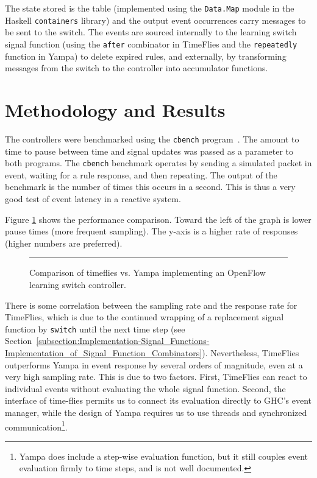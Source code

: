 The state stored is the table (implemented using the {\tt Data.Map} module in the
Haskell {\tt containers} library) and the output event occurrences carry messages
to be sent to the switch. The events are sourced internally to the learning
switch signal function (using the {\tt after} combinator in TimeFlies and the {\tt repeatedly}
function in Yampa) to delete expired rules, and externally, by transforming messages
from the switch to the controller into accumulator functions.

\section{Methodology and Results}
\label{section:Evaluation_and_Comparisons-Methodology_and_Results}

The controllers were benchmarked using the {\tt cbench} program~\cite{cbench}. The
amount to time to pause between time and signal updates was passed as a parameter to
both programs. The {\tt cbench} benchmark operates by sending a simulated packet in
event, waiting for a rule response, and then repeating. The output of the benchmark
is the number of times this occurs in a second. This is thus a very good test of
event latency in a reactive system.

Figure \ref{fig:timeflies-yampa-comparison} shows the performance comparison.
Toward the left of the graph is lower pause times (more frequent sampling). The
y-axis is a higher rate of responses (higher numbers are preferred). 

\begin{figure}
\hrule
\caption{Comparison of timeflies vs. Yampa implementing an OpenFlow learning switch controller.}
\label{fig:timeflies-yampa-comparison}
\end{figure}

There is some correlation between the sampling rate and the response rate
for TimeFlies, which is due to the continued wrapping of a replacement signal
function by {\tt switch} until the next time step (see Section~\ref{subsection:Implementation-Signal_Functions-Implementation_of_Signal_Function_Combinators}).
Nevertheless, TimeFlies outperforms Yampa in event response by several orders of magnitude,
even at a very high sampling rate. This is due to two factors. First, TimeFlies can react
to individual events without evaluating the whole signal function. Second, the
interface of time-flies permits us to connect its evaluation directly to GHC's event
manager, while the design of Yampa requires us to use threads and synchronized
communication\footnote{Yampa does include a step-wise evaluation function, but
it still couples event evaluation firmly to time steps, and is not well
documented.}.

